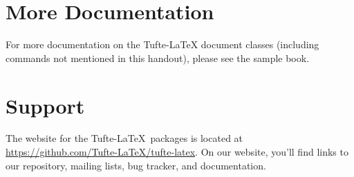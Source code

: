 \documentclass{tufte-handout}
\begin{document}



\section{More Documentation}\label{sec:more-doc}
For more documentation on the Tufte-\LaTeX{} document classes (including commands not
mentioned in this handout), please see the sample book.

\section{Support}\label{sec:support}

The website for the Tufte-\LaTeX\ packages is located at
\url{https://github.com/Tufte-LaTeX/tufte-latex}.  On our website, you'll find
links to our  repository, mailing lists, bug tracker, and documentation.



\end{document}
